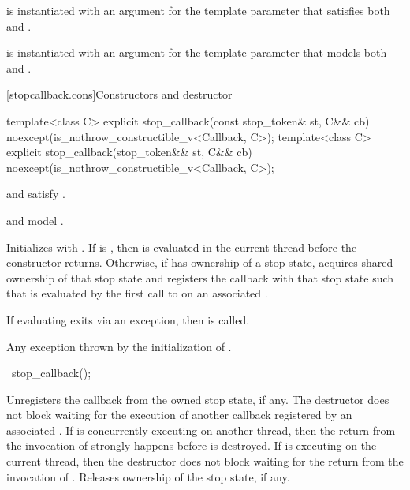 \pnum
\mandates
{} is instantiated with an argument for the
template parameter 
that satisfies both 
and .

\pnum
\expects
{} is instantiated with an argument for the
template parameter 
that models both 
and .


[stopcallback.cons]{Constructors and destructor}

%
\begin{itemdecl}
template<class C>
explicit stop_callback(const stop_token& st, C&& cb)
  noexcept(is_nothrow_constructible_v<Callback, C>);
template<class C>
explicit stop_callback(stop_token&& st, C&& cb)
  noexcept(is_nothrow_constructible_v<Callback, C>);
\end{itemdecl}
\begin{itemdescr}
\pnum
\constraints
{} and  satisfy .

\pnum
\expects
{} and  model .

\pnum
\effects
Initializes  with .
If  is , then
is evaluated in the current thread before the constructor returns.
Otherwise, if  has ownership of a stop state,
acquires shared ownership of that stop state and registers
the callback with that stop state
such that 
is evaluated by the first call to 
on an associated .

\pnum
\remarks
If evaluating
exits via an exception,
then  is called.

\pnum
\throws
Any exception thrown by the initialization of .
\end{itemdescr}

%
\begin{itemdecl}
~stop_callback();
\end{itemdecl}

\begin{itemdescr}
\pnum
\effects
Unregisters the callback from the owned stop state, if any.
The destructor does not block waiting for the execution of another callback
registered by an associated .
If  is concurrently executing on another thread,
then the return from the invocation of 
strongly happens before
 is destroyed.
If  is executing on the current thread,
then the destructor does not block waiting for
the return from the invocation of .
Releases ownership of the stop state, if any.
\end{itemdescr}



